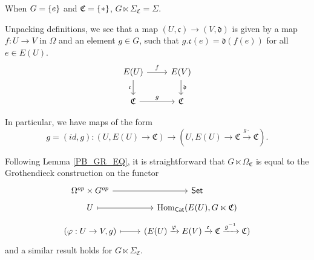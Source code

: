 \documentclass[a4paper,10pt
,draft
]{article}%
\renewcommand{\phi}{\varphi}
\renewcommand{\1}{\ensuremath{\mathbb{id}}}
\begin{document}
\begin{remark}
      When $G = \left\{e\right\}$ and $\mathfrak C = \left\{*\right\}$, $G \ltimes \Sigma_{\mathfrak C} = \Sigma$.
\end{remark}

Unpacking definitions, we see that a map $(U, \mathfrak c) \to (V, \mathfrak d)$ is given by
a map $f: U \to V$ in $\Omega$ and an element $g\in G$,
such that $g.\mathfrak c(e) = \mathfrak d(f(e))$ for all $e \in E(U)$.
\begin{equation}
      \begin{tikzcd}
            E(U) \arrow[r, "f"] \arrow[d, "\mathfrak c"']
            &
            E(V) \arrow[d, "\mathfrak d"]
            \\
            \mathfrak C \arrow[r, "g"]
            &
            \mathfrak C
      \end{tikzcd}
\end{equation}

In particular, we have maps of the form
\begin{equation}
      g = (id, g): (U, E(U) \to \mathfrak C) \to (U, E(U) \to \mathfrak C \xrightarrow{g \cdot} \mathfrak C). 
\end{equation}

\begin{remark}
      Following Lemma \ref{PB_GR_EQ}, it is straightforward that
      $G \ltimes \Omega_{\mathfrak C}$ is equal to the
      Grothendieck construction on the functor
      \begin{equation}
            \label{COMEGA_B_GR_EQ}
            \begin{tikzcd}[row sep = tiny]
                  \Omega^{op} \times G^{op} \arrow[r]
                  &
                  \mathsf{Set}
                  \\
                  U \arrow[r, mapsto]
                  &
                  \Hom_{\mathsf{Cat}}(E(U), G \ltimes \mathfrak C)
                  \\
                  (\phi: U \to V, g) \arrow[r, mapsto]
                  &
                  (E(U) \xrightarrow{\phi} E(V) \xrightarrow{\mathfrak c} \mathfrak C \xrightarrow{g^{-1}} \mathfrak C)
            \end{tikzcd}
      \end{equation}
      and a similar result holds for $G \ltimes \Sigma_{\mathfrak C}$. 
\end{remark}
\end{document}
